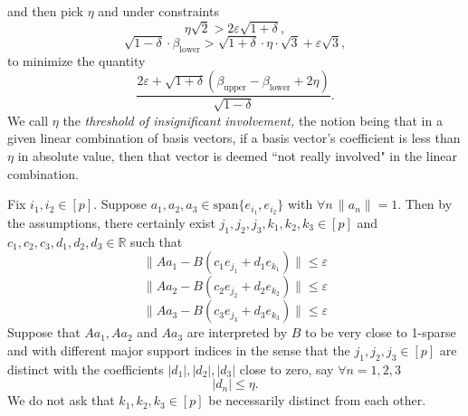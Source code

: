 \documentclass[11pt]{amsart}
\newcommand{\R}{\mathbb{R}}
\begin{document}
and then pick $\eta$ and under constraints
\[\eta \sqrt{2} > 2\varepsilon\sqrt{1+\delta} ,\]
\[\sqrt{1-\delta} \cdot \beta_\text{lower} > \sqrt{1+\delta} \cdot \eta \cdot \sqrt{3}+ \varepsilon \sqrt{3},\] to minimize the quantity
\[\frac{2 \varepsilon + \sqrt{1+\delta} \left(\beta_\text{upper}-\beta_\text{lower} +2\eta\right)}{\sqrt{1-\delta}} .\] 
We call $\eta$ the \emph{threshold of insignificant involvement,} the notion being that in a given linear combination of basis vectors, if
a basis vector's coefficient is less than $\eta$ in absolute value, then that vector is deemed ``not really involved" in the linear combination.  

Fix $i_1, i_2 \in [p]$.  Suppose $a_1, a_2, a_3\in \text{span}\{e_{i_1}, e_{i_2}\}$ with $\forall n\, \|a_n\|=1$.
Then by the assumptions, there certainly exist $j_1, j_2, j_3,k_1, k_2, k_3\in [p]$ and $c_1,c_2,c_3, d_1, d_2, d_3 \in \R$ such that
\[\|Aa_1 - B(c_1e_{j_1}+d_1 e_{k_1})\|\leq \varepsilon \]   
\[\|Aa_2 - B(c_2e_{j_2}+d_2 e_{k_2})\|\leq \varepsilon \]   
\[\|Aa_3 - B(c_3e_{j_3}+d_3 e_{k_3})\|\leq \varepsilon \]   
Suppose that $Aa_1, A a_2$ and $Aa_3$ are interpreted by $B$ to be very close to 1-sparse and 
with different major support indices in the sense that the
 $j_1, j_2, j_3\in [p]$ are distinct with the coefficients $|d_1|, |d_2|, |d_3|$ close to zero, say $\forall n=1,2,3$
\[|d_n| \leq \eta.\] 
We do not ask that $k_1, k_2, k_3\in [p]$ be necessarily distinct from each other.  
\end{document}

